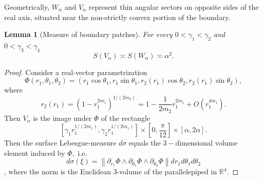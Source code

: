 \documentclass[review]{elsarticle}
\newtheorem{lem}[thm]{Lemma}
\begin{document}
Geometrically, $W_\alpha$ and $V_\alpha$ represent thin angular sectors on opposite sides of the real axis, situated near the non-strictly convex portion of the boundary.

\begin{lem}[Measure of boundary patches] For every $0<\gamma_1<\gamma_2$ and $0<\gamma_3<\gamma_4$
	$$S(V_\alpha)\asymp S(W_\alpha) \asymp \alpha^{2}.$$
\end{lem}

\begin{proof}
		Consider a real-vector parametrization 
		$$
		\Phi\left(r_1, \theta_1, \theta_2\right)=\left(r_1 \cos \theta_1, r_1 \sin \theta_1, r_2\left(r_1\right) \cos \theta_2, r_2\left(r_1\right) \sin \theta_2\right),
		$$
		where
		$$
		r_2(r_1) =\left(1-r_1^{2m_1}\right)^{1/{(2m_2)}} = 1 - \frac{1}{2m_2}r_1^{2m_1} +O(r_1^{4m_1}).
		$$
		Then $V_\alpha $ is the image under $\Phi$ of the rectangle
		$$
		\left[\gamma_1 r_1^{1/(2m_1)},\gamma_2 r_1^{1/(2m_1)}\right] \times \left[0,\frac{\pi}{12}\right]\times [\alpha,2\alpha].
		$$
		Then the surface Lebesgue-measure $d\sigma$ equals the $3-$dimensional volume element induced by $\Phi,$ i.e.
		$$d\sigma(\xi) = \left\|\partial_{r_1} \Phi \wedge \partial_{\theta_1} \Phi \wedge \partial_{\theta_2} \Phi\right\| d r_1 d \theta_1 d \theta_2 $$,
		where the norm is the Euclidean 3-volume of the parallelepiped in  $\mathbb{R}^4.$
		

\end{proof}
\end{document}
